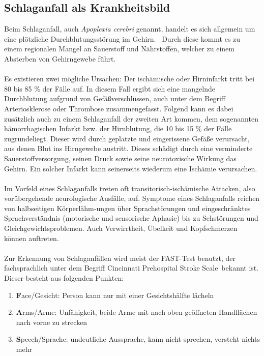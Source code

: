 \subsection{Schlaganfall als Krankheitsbild}
Beim Schlaganfall, auch \textit{Apoplexia cerebri} genannt, handelt es sich allgemein um eine \glqq plötzliche Durchblutungsstörung im Gehirn.\grqq ~\cite{Src:ApoNetdokt} Durch diese kommt es zu einem regionalen Mangel an Sauerstoff und Nährstoffen, welcher zu einem Absterben von Gehirngewebe führt.
\\ \\
Es existieren zwei mögliche Ursachen: Der ischämische oder Hirninfarkt tritt bei 80 bis 85 \% der Fälle auf. In diesem Fall ergibt sich eine mangelnde Durchblutung aufgrund von Gefäßverschlüssen, auch unter dem Begriff Arteriosklerose oder Thrombose zusammengefasst. Folgend kann es dabei zusätzlich auch zu einem Schlaganfall der zweiten Art kommen, dem sogenannten hämorrhagischen Infarkt bzw. der Hirnblutung, die 10 bis 15 \% der Fälle zugrundeliegt. Dieser wird durch geplatzte und eingerissene Gefäße verursacht, aus denen Blut ins Hirngewebe austritt. Dieses schädigt durch eine verminderte Sauerstoffversorgung, seinen Druck sowie seine neurotoxische Wirkung das Gehirn. Ein solcher Infarkt kann seinerseits wiederum eine Ischämie verursachen.\cite{Src:ApoFlex}
\\ \\
Im Vorfeld eines Schlaganfalls treten oft transitorisch-ischämische Attacken, also vorübergehende neurologische Ausfälle, auf. Symptome eines Schlaganfalls reichen von halbseitigen Körperlähm-ungen über Sprachstörungen und eingeschränktes Sprachverständnis (motorische und sensorische Aphasie) bis zu Sehstörungen und Gleichgewichtsproblemen. Auch Verwirrtheit, Übelkeit und Kopfschmerzen können auftreten.\cite{Src:ApoFlex}
\\ \\
Zur Erkennung von Schlaganfällen wird meist der FAST-Test benutzt, der fachsprachlich unter dem Begriff \glqq Cincinnati Prehospital Stroke Scale\grqq ~bekannt ist.\cite{Src:ApoWiki} Dieser besteht aus folgenden Punkten:
\begin{enumerate}
\item \textbf{F}ace/Gesicht: Person kann nur mit einer Gesichtshälfte lächeln
\item \textbf{A}rms/Arme: Unfähigkeit, beide Arme mit nach oben geöffneten Handflächen nach vorne zu strecken
\item \textbf{S}peech/Sprache: undeutliche Aussprache, kann nicht sprechen, versteht nichts mehr
\end{enumerate}
